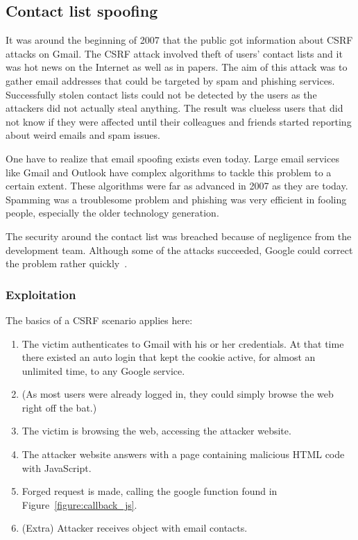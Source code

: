 \documentclass[a4paper,11pt,openany]{report}
\begin{document}
  
  \subsection{Contact list spoofing}
  It was around the beginning of 2007 that the public got information about CSRF attacks on Gmail. The CSRF 
  attack involved theft of users' contact lists and it was hot news on the Internet as well as in papers. The 
  aim of this attack was to gather email addresses that could be targeted by spam and phishing services.
  Successfully stolen contact lists could not be detected by the users as the attackers did not actually steal
  anything. The result was clueless users that did not know if they were affected until their colleagues and 
  friends started reporting about weird emails and spam issues.
  
  One have to realize that email spoofing exists even today. Large email services like Gmail and Outlook have
  complex algorithms to tackle this problem to a certain extent. These algorithms were far as advanced in 2007 as 
  they are today. Spamming was a troublesome problem and phishing was very efficient in fooling people, especially 
  the older technology generation.
  
  The security around the contact list was breached because of negligence from the development team. Although
  some of the attacks succeeded, Google could correct the problem rather quickly~\cite{oreilly}.

  \subsubsection{Exploitation}
  The basics of a CSRF scenario applies here:
  \begin{enumerate}
   \item The victim authenticates to Gmail with his or her credentials. At that time there existed an auto login
   that kept the cookie active, for almost an unlimited time, to any Google service.
   \item (As most users were already logged in, they could simply browse the web right off the bat.)
   \item The victim is browsing the web, accessing the attacker website. 
   \item The attacker website answers with a page containing malicious HTML code with JavaScript.
   \item Forged request is made, calling the google function found in Figure~\ref{figure:callback_js}.
   \item (Extra) Attacker receives object with email contacts. %
  \end{enumerate}
  
\end{document}
